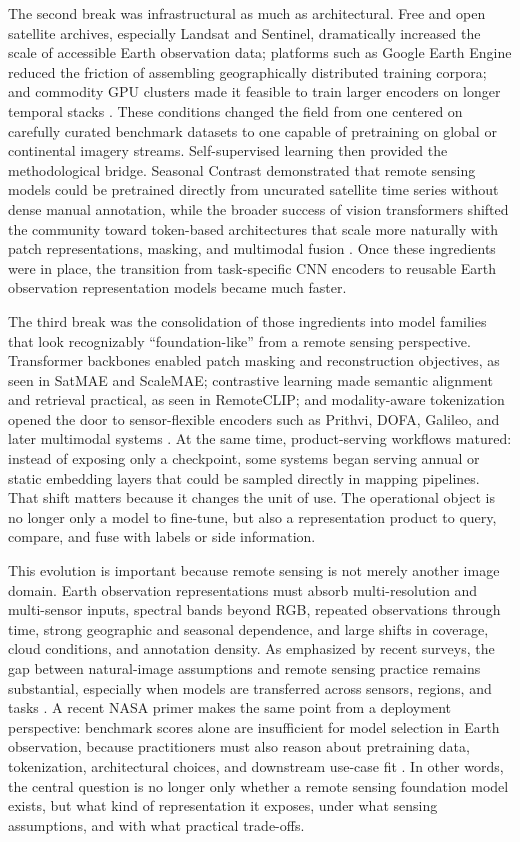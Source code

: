 The second break was infrastructural as much as architectural. Free and open satellite archives, especially Landsat and Sentinel, dramatically increased the scale of accessible Earth observation data; platforms such as Google Earth Engine reduced the friction of assembling geographically distributed training corpora; and commodity GPU clusters made it feasible to train larger encoders on longer temporal stacks \citep{gee2017}. These conditions changed the field from one centered on carefully curated benchmark datasets to one capable of pretraining on global or continental imagery streams. Self-supervised learning then provided the methodological bridge. Seasonal Contrast demonstrated that remote sensing models could be pretrained directly from uncurated satellite time series without dense manual annotation, while the broader success of vision transformers shifted the community toward token-based architectures that scale more naturally with patch representations, masking, and multimodal fusion \citep{seco2021,vit2021,vitrs2021}. Once these ingredients were in place, the transition from task-specific CNN encoders to reusable Earth observation representation models became much faster.

The third break was the consolidation of those ingredients into model families that look recognizably ``foundation-like'' from a remote sensing perspective. Transformer backbones enabled patch masking and reconstruction objectives, as seen in SatMAE and ScaleMAE; contrastive learning made semantic alignment and retrieval practical, as seen in RemoteCLIP; and modality-aware tokenization opened the door to sensor-flexible encoders such as Prithvi, DOFA, Galileo, and later multimodal systems \citep{satmae,scalemae,remoteclip,prithvi,dofa,galileo}. At the same time, product-serving workflows matured: instead of exposing only a checkpoint, some systems began serving annual or static embedding layers that could be sampled directly in mapping pipelines. That shift matters because it changes the unit of use. The operational object is no longer only a model to fine-tune, but also a representation product to query, compare, and fuse with labels or side information.

This evolution is important because remote sensing is not merely another image domain. Earth observation representations must absorb multi-resolution and multi-sensor inputs, spectral bands beyond RGB, repeated observations through time, strong geographic and seasonal dependence, and large shifts in coverage, cloud conditions, and annotation density. As emphasized by recent surveys, the gap between natural-image assumptions and remote sensing practice remains substantial, especially when models are transferred across sensors, regions, and tasks \citep{survey1,survey3,survey4}. A recent NASA primer makes the same point from a deployment perspective: benchmark scores alone are insufficient for model selection in Earth observation, because practitioners must also reason about pretraining data, tokenization, architectural choices, and downstream use-case fit \citep{primer_eo}. In other words, the central question is no longer only whether a remote sensing foundation model exists, but what kind of representation it exposes, under what sensing assumptions, and with what practical trade-offs.

